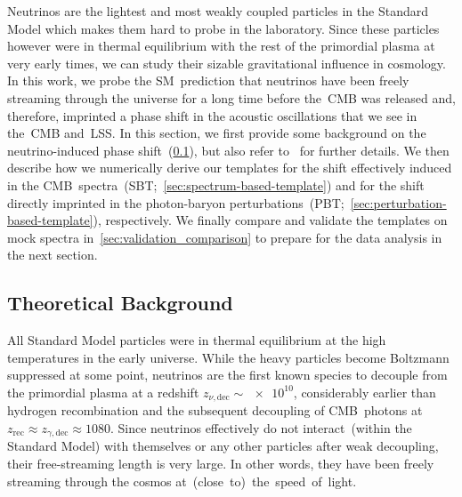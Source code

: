 \documentclass[11pt]{article}
\numberwithin{equation}{section}
\begin{document}
Neutrinos are the lightest and most weakly coupled particles in the Standard Model which makes them hard to probe in the laboratory. Since these particles however were in thermal equilibrium with the rest of the primordial plasma at very early times, we can study their sizable gravitational influence in cosmology. In this work, we probe the SM~prediction that neutrinos have been freely streaming through the universe for a long time before the~CMB was released and, therefore, imprinted a phase shift in the acoustic oscillations that we see in the~CMB and~LSS. In this section, we first provide some background on the neutrino-induced phase shift~(\textsection\ref{sec:background-theory}), but also refer to~\cite{Bashinsky:2003tk, Follin:2015hya, Baumann:2015rya, Wallisch:2018rzj} for further details. We then describe how we numerically derive our templates for the shift effectively induced in the CMB~spectra~(SBT;~\textsection\ref{sec:spectrum-based-template}) and for the shift directly imprinted in the photon-baryon perturbations~(PBT;~\textsection\ref{sec:perturbation-based-template}), respectively. We finally compare and validate the templates on mock spectra in~\textsection\ref{sec:validation_comparison} to prepare for the data analysis in the next section.


\subsection{Theoretical Background}
\label{sec:background-theory}

All Standard Model particles were in thermal equilibrium at the high temperatures in the early universe. While the heavy particles become Boltzmann suppressed at some point, neutrinos are the first known species to decouple from the primordial plasma at a redshift $z_{\nu, \mathrm{dec}} \sim \num{e10}$, considerably earlier than hydrogen recombination and the subsequent decoupling of CMB~photons at $z_\mathrm{rec} \approx z_{\gamma, \mathrm{dec}} \approx 1080$. Since neutrinos effectively do not interact~(within the Standard Model) with themselves or any other particles after weak decoupling, their free-streaming length is very large. In other words, they have been freely streaming through the cosmos \mbox{at~(close to) the speed of light}.\medskip
\end{document}
